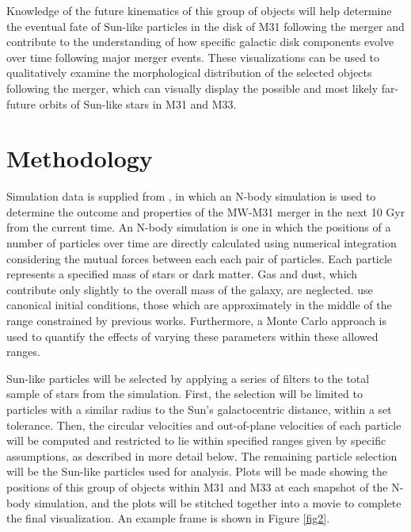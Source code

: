 \documentclass[twocolumn]{aastex631}
\begin{document}
Knowledge of the future kinematics of this group of objects will help determine the eventual fate of Sun-like particles in the disk of M31 following the merger and contribute to the understanding of how specific galactic disk components evolve over time following major merger events. These visualizations can be used to qualitatively examine the morphological distribution of the selected objects following the merger, which can visually display the possible and most likely far-future orbits of Sun-like stars in M31 and M33. 


\section{Methodology} \label{sec:methodology}
Simulation data is supplied from \citet{2012ApJ...753....9V}, in which an N-body simulation is used to determine the outcome and properties of the MW-M31 merger in the next 10 Gyr from the current time. An N-body simulation is one in which the positions of a number of particles over time are directly calculated using numerical integration considering the mutual forces between each each pair of particles. Each particle represents a specified mass of stars or dark matter. Gas and dust, which contribute only slightly to the overall mass of the galaxy, are neglected. \citet{2012ApJ...753....9V} use canonical initial conditions, those which are approximately in the middle of the range constrained by previous works. Furthermore, a Monte Carlo approach is used to quantify the effects of varying these parameters within these allowed ranges.

Sun-like particles will be selected by applying a series of filters to the total sample of stars from the simulation. First, the selection will be limited to particles with a similar radius to the Sun's galactocentric distance, within a set tolerance. Then, the circular velocities and out-of-plane velocities of each particle will be computed and restricted to lie within specified ranges given by specific assumptions, as described in more detail below. The remaining particle selection will be the Sun-like particles used for analysis. Plots will be made showing the positions of this group of objects within M31 and M33 at each snapshot of the N-body simulation, and the plots will be stitched together into a movie to complete the final visualization. An example frame is shown in Figure \ref{fig2}.
\end{document}
